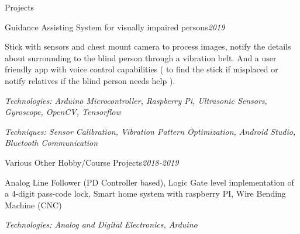 \documentclass{resume} %
\begin{document}
\begin{rSection}{Projects}


\begin{rSubsection}{Guidance Assisting System for visually impaired persons}{\em {2019}}{}{}
\item Stick with sensors and chest mount camera to process images, notify the details about surrounding to the blind person through a vibration belt. And a user friendly app with voice control capabilities ( to find the stick if misplaced or notify relatives if the blind person needs help ). 
\item \textit{Technologies: Arduino Microcontroller, Raspberry Pi, Ultrasonic Sensors, Gyroscope, OpenCV, Tensorflow} 
\item \textit{Techniques: Sensor Calibration, Vibration Pattern Optimization, Android Studio, Bluetooth Communication}
\end{rSubsection}

\begin{rSubsection}{Various Other Hobby/Course Projects}{\em {2018-2019}}{}{}
\item Analog Line Follower (PD Controller based), Logic Gate level implementation of a 4-digit pass-code lock, Smart home system with raspberry PI, Wire Bending Machine (CNC)
\item \textit{Technologies: Analog and Digital Electronics, Arduino}
\end{rSubsection}
\end{rSection}

\end{document}

